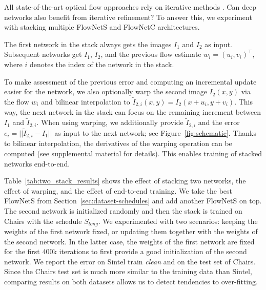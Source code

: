 \documentclass[10pt,twocolumn,letterpaper]{article}%
\newcommand{\chairs}{\mbox{Chairs}\xspace}
\newcommand{\Slong}{S_\mathit{long}}
\newcommand{\neta}{Net1\xspace}
\newcommand{\netb}{Net2\xspace}
\begin{document}

All state-of-the-art optical flow approaches rely on iterative methods \cite{ldof,deepflow,epicflow,flowfields}. Can deep networks also benefit from iterative refinement? To answer this, we experiment with stacking multiple FlowNetS and FlowNetC architectures. 

The first network in the stack always gets the images $I_1$ and $I_2$ as input. Subsequent networks get $I_1$, $I_2$, and the previous flow estimate $w_i=(u_i,v_i)^\top$, where $i$ denotes the index of the network in the stack. 

To make assessment of the previous error and computing an incremental update easier for the network, we also
optionally warp the second image $I_2(x,y)$ via the flow $w_i$ and bilinear interpolation to $\tilde I_{2,i}(x,y)=I_2(x+u_i,y+v_i)$. This way, the next network in the stack can focus on the remaining increment between $I_1$ and $\tilde I_{2,i}$. 
When using warping, we additionally provide $\tilde I_{2,i}$ and the error $e_i=||\tilde I_{2,i}-I_1||$ as input to the next network; see Figure~\ref{fig:schematic}. 
Thanks to bilinear interpolation, the derivatives of the warping operation can be computed (see supplemental material for details).  
This enables training of stacked networks end-to-end. 

Table~\ref{tab:two_stack_results} shows the effect of stacking two networks, the effect of warping, and the effect of end-to-end training. We take the best FlowNetS from Section~\ref{sec:dataset-schedules} and add another FlowNetS on top. The second network is initialized randomly and then the stack is trained on \chairs with the schedule $\Slong$. We experimented with two scenarios: keeping the weights of the first network fixed, or updating them together with the weights of the second network. In the latter case, the weights of the first network are fixed for the first 400k iterations to first provide a good initialization of the second network. 
We report the error on Sintel train \textit{clean} and on the test set of \chairs. Since the \chairs test set is much more similar to the training data than Sintel, comparing results on both datasets allows us to detect tendencies to over-fitting.   
\end{document}
